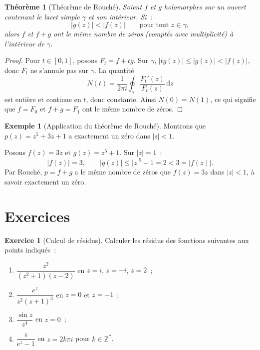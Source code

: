 \documentclass[12pt,a4paper,openany]{book}
\theoremstyle{definition}
\newtheorem{exemple}[definition]{Exemple}
\newtheorem{exercice}{Exercice}[chapter]
\theoremstyle{plain}
\newtheorem{theoreme}[definition]{Théorème}
\theoremstyle{remark}
\newcommand{\Z}{\mathbb{Z}}
\newcommand{\dd}{\mathrm{d}}
\newcommand{\abs}[1]{\left|#1\right|}
\begin{document}
\begin{theoreme}[Théorème de Rouché]\label{thm:rouche}
Soient $f$ et $g$ holomorphes sur un ouvert contenant le lacet simple $\gamma$
et son intérieur. Si~:
\[
  \abs{g(z)} < \abs{f(z)} \qquad \text{pour tout } z \in \gamma,
\]
alors $f$ et $f + g$ ont le même nombre de zéros (comptés avec multiplicité)
à l'intérieur de $\gamma$.
\end{theoreme}

\begin{proof}
Pour $t \in [0,1]$, posons $F_t = f + tg$. Sur $\gamma$, $\abs{tg(z)} \leq \abs{g(z)} < \abs{f(z)}$,
donc $F_t$ ne s'annule pas sur $\gamma$. La quantité
\[
  N(t) = \frac{1}{2\pi i} \oint_\gamma \frac{F_t'(z)}{F_t(z)}\,\dd z
\]
est entière et continue en $t$, donc constante. Ainsi $N(0) = N(1)$, ce qui
signifie que $f = F_0$ et $f + g = F_1$ ont le même nombre de zéros.
\end{proof}

\begin{exemple}[Application du théorème de Rouché]\label{ex:rouche}
Montrons que $p(z) = z^5 + 3z + 1$ a exactement un zéro dans $\abs{z} < 1$.

Posons $f(z) = 3z$ et $g(z) = z^5 + 1$. Sur $\abs{z} = 1$~:
\[
  \abs{f(z)} = 3, \qquad \abs{g(z)} \leq \abs{z}^5 + 1 = 2 < 3 = \abs{f(z)}.
\]
Par Rouché, $p = f + g$ a le même nombre de zéros que $f(z) = 3z$ dans $\abs{z} < 1$,
à savoir exactement un zéro.
\end{exemple}

\section{Exercices}\label{sec:exo-residus}

\begin{exercice}[Calcul de résidus]\label{exo:calcul-residus}
Calculer les résidus des fonctions suivantes aux points indiqués~:
\begin{enumerate}[label=\alph*)]
  \item $\dfrac{z^2}{(z^2+1)(z-2)}$ en $z = i$, $z = -i$, $z = 2$~;
  \item $\dfrac{e^z}{z^2(z+1)^3}$ en $z = 0$ et $z = -1$~;
  \item $\dfrac{\sin z}{z^4}$ en $z = 0$~;
  \item $\dfrac{z}{e^z - 1}$ en $z = 2k\pi i$ pour $k \in \Z^*$.
\end{enumerate}
\end{exercice}
\end{document}
